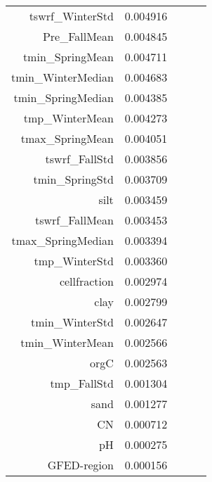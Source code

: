 \begin{table}[h]
\begin{tabular}{rrrrr}
tswrf_WinterStd & 0.004916 \\
Pre_FallMean & 0.004845 \\
tmin_SpringMean & 0.004711 \\
tmin_WinterMedian & 0.004683 \\
tmin_SpringMedian & 0.004385 \\
tmp_WinterMean & 0.004273 \\
tmax_SpringMean & 0.004051 \\
tswrf_FallStd & 0.003856 \\
tmin_SpringStd & 0.003709 \\
silt & 0.003459 \\
tswrf_FallMean & 0.003453 \\
tmax_SpringMedian & 0.003394 \\
tmp_WinterStd & 0.003360 \\
cellfraction & 0.002974 \\
clay & 0.002799 \\
tmin_WinterStd & 0.002647 \\
tmin_WinterMean & 0.002566 \\
orgC & 0.002563 \\
tmp_FallStd & 0.001304 \\
sand & 0.001277 \\
CN & 0.000712 \\
pH & 0.000275 \\
GFED-region & 0.000156 \\
\bottomrule
\end{tabular}
\end{table}
